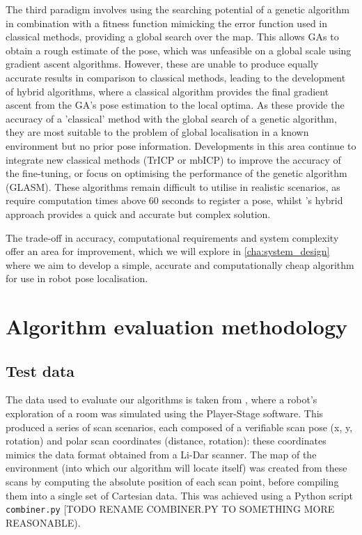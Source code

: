 \documentclass[authoryearcitations]{UoYCSproject}
\begin{document}
The third paradigm involves using the searching potential of a genetic algorithm in combination with a fitness function mimicking the error function used in classical methods, providing a global search over the map. This allows GAs to obtain a rough estimate of the pose, which was unfeasible on a global scale using gradient ascent algorithms. However, these are unable to produce equally accurate results in comparison to classical methods, leading to the development of hybrid algorithms, where a classical algorithm provides the final gradient ascent from the GA's pose estimation to the local optima. As these provide the accuracy of a 'classical' method with the global search of a genetic algorithm, they are most suitable to the problem of global localisation in a known environment but no prior pose information. Developments in this area continue to integrate new classical methods (TrICP or mbICP) to improve the accuracy of the fine-tuning, or focus on optimising the performance of the genetic algorithm (GLASM). These algorithms remain difficult to utilise in realistic scenarios, as \citet{Chow2004-xc} require computation times above 60 seconds to register a pose, whilst \citet{Lenac2011-co}'s hybrid approach provides a quick and accurate but complex solution. 

The trade-off in accuracy, computational requirements and system complexity offer an area for improvement, which we will explore in \autoref{cha:system_design} where we aim to develop a simple, accurate and computationally cheap algorithm for use in robot pose localisation.

\clearpage

\chapter{Algorithm evaluation methodology}
\label{cha:system_design}

\section{Test data}
The data used to evaluate our algorithms is taken from \citet{Lenac2011-co}, where a robot's exploration of a room was simulated using the Player-Stage software. This produced a series of scan scenarios, each composed of a verifiable scan pose (x, y, rotation) and polar scan coordinates (distance, rotation): these coordinates mimics the data format obtained from a Li-Dar scanner. The map of the environment (into which our algorithm will locate itself) was created from these scans by computing the absolute position of each scan point, before compiling them into a single set of Cartesian data. This was achieved using a Python script \lstinline{combiner.py} [TODO RENAME COMBINER.PY TO SOMETHING MORE REASONABLE).
\end{document}
